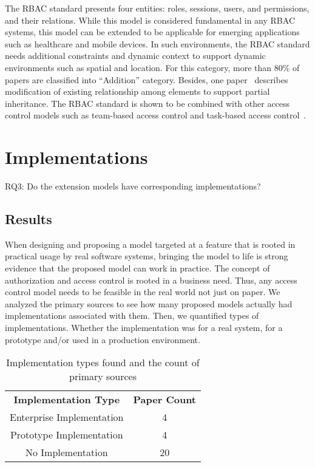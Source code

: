 The RBAC standard presents four entities: roles, sessions, users, and permissions, and their relations. While this model is considered fundamental in any RBAC systems, this model can be extended to be applicable for emerging applications such as healthcare and mobile devices. 
In such environments, the RBAC standard needs additional constraints and dynamic context to support dynamic environments such as spatial and location. For this category, more than 80\% of papers are classified into ``Addition'' category. Besides, one paper~\cite{alam06:constraint} describes modification of existing relationship among elements to support partial inheritance. The RBAC standard is shown to be combined with other access control models such as team-based access control and task-based access control~\cite{zhou2007team, oh2003task}.





\section{Implementations} \label{sec:implementations}

RQ3: Do the extension models have corresponding implementations?

\subsection{Results}

When designing and proposing a model targeted at a feature that is rooted in practical
usage by real software systems, bringing the model to life is strong evidence that the
proposed model can work in practice. The concept of authorization and access control
is rooted in a business need. Thus, any access control model needs to be feasible
in the real world not just on paper. We analyzed the primary sources to see how many
proposed models actually had implementations associated with them.  Then, we quantified
types of implementations. Whether the implementation was for a real system, for a prototype
and/or used in a production environment.

\begin{table}
\centering
\caption{Implementation types found and the count of primary sources}
\begin{tabular}{ | c | c | }
\cline{1-2}

\textbf{Implementation Type} & \textbf{Paper Count} \\ \cline{1-2}
Enterprise Implementation & 4 \\ \cline{1-2}
Prototype Implementation & 4 \\ \cline{1-2}
No Implementation & 20 \\

\cline{1-2}
\end{tabular}
\label{tab:implementations}
\end{table}

